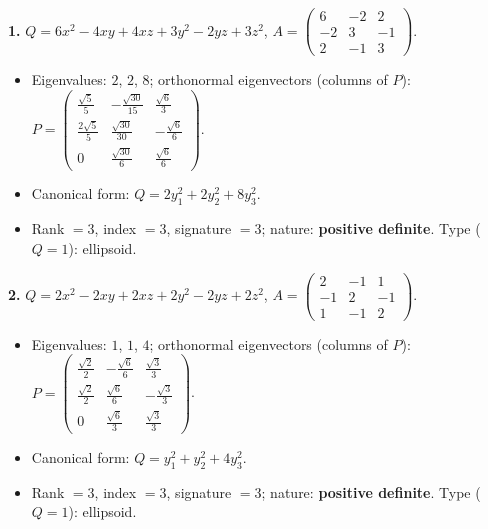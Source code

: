 \noindent\textbf{1.} $Q=6 x^{2} - 4 x y + 4 x z + 3 y^{2} - 2 y z + 3 z^{2}$, $A=\begin{pmatrix}6 & -2 & 2 \\ -2 & 3 & -1 \\ 2 & -1 & 3\end{pmatrix}$.
\begin{itemize}\item Eigenvalues: $2$, $2$, $8$; orthonormal eigenvectors (columns of $P$): $P=\begin{pmatrix}\frac{\sqrt{5}}{5} & - \frac{\sqrt{30}}{15} & \frac{\sqrt{6}}{3} \\ \frac{2 \sqrt{5}}{5} & \frac{\sqrt{30}}{30} & - \frac{\sqrt{6}}{6} \\ 0 & \frac{\sqrt{30}}{6} & \frac{\sqrt{6}}{6}\end{pmatrix}$.
\item Canonical form: $Q=2 y_{1}^{2} + 2 y_{2}^{2} + 8 y_{3}^{2}$.
\item Rank $=3$, index $=3$, signature $=3$; nature: \textbf{positive definite}. Type ($Q=1$): ellipsoid.\end{itemize}

\noindent\textbf{2.} $Q=2 x^{2} - 2 x y + 2 x z + 2 y^{2} - 2 y z + 2 z^{2}$, $A=\begin{pmatrix}2 & -1 & 1 \\ -1 & 2 & -1 \\ 1 & -1 & 2\end{pmatrix}$.
\begin{itemize}\item Eigenvalues: $1$, $1$, $4$; orthonormal eigenvectors (columns of $P$): $P=\begin{pmatrix}\frac{\sqrt{2}}{2} & - \frac{\sqrt{6}}{6} & \frac{\sqrt{3}}{3} \\ \frac{\sqrt{2}}{2} & \frac{\sqrt{6}}{6} & - \frac{\sqrt{3}}{3} \\ 0 & \frac{\sqrt{6}}{3} & \frac{\sqrt{3}}{3}\end{pmatrix}$.
\item Canonical form: $Q=y_{1}^{2} + y_{2}^{2} + 4 y_{3}^{2}$.
\item Rank $=3$, index $=3$, signature $=3$; nature: \textbf{positive definite}. Type ($Q=1$): ellipsoid.\end{itemize}

